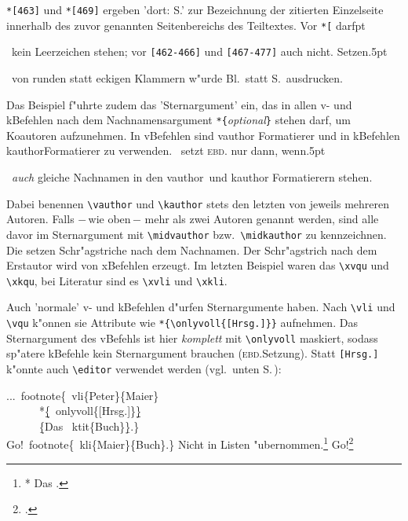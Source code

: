 \documentclass[12pt,a4paper]{article}
\newcommand{\pdfko}[1]{\kern #1pt
                          \strut\ignorespaces}%
\newcommand{\pbs}{\string\ \unskip}
\newcommand{\bs}{\protect\pbs}
\begin{document}
\vspace{.75ex}\noindent
\verb|*[463]| und \verb|*[469]| ergeben 'dort: S.' zur Bezeichnung der 
zitierten Einzelseite innerhalb des zuvor genannten Seitenbereichs des 
Teiltextes. Vor \verb|*[| darf\pdfko{1}\ kein Leerzeichen stehen; vor 
\verb|[462-466]| und \verb|[467-477]| auch nicht. Setzen\pdfko{.5}\ 
von runden statt eckigen Klammern w"urde Bl.\ statt S.\ ausdrucken.

Das Beispiel f"uhrte zudem das 'Sternargument' ein, das in allen v- 
und k\hy Befehlen nach dem Nachnamensargument \verb|*{|\textit{optional}\verb|}| 
stehen darf, um Koautoren aufzunehmen. In v\fhy Befehlen sind vauthor\hy 
Formatierer und in k\fhy Befehlen kauthor\fhy Formatierer zu verwenden. 
\BibArts\ setzt \textsc{ebd.} nur dann, wenn\pdfko{.5}\  
\textit{auch} gleiche Nachnamen in den vauthor\hy\ und kauthor\hy 
Formatierern stehen. 

Dabei benennen \verb|\vauthor| und \verb|\kauthor| stets den letzten von 
jeweils mehreren Autoren. Falls $-$\,wie oben\,$-$ mehr als zwei
Autoren genannt werden, sind alle davor im Sternargument mit 
\verb|\midvauthor| bzw.\ \verb|\midkauthor| zu kennzeichnen. Die setzen 
Schr"agstriche nach dem Nachnamen. Der Schr"agstrich nach dem Erstautor 
wird von x\fhy Befehlen erzeugt. Im letzten Beispiel waren das \verb|\xvqu| 
und \verb|\xkqu|, bei Literatur sind es \verb|\xvli| und 
\verb|\xkli|. 

Auch 'normale' v- und k\fhy Befehlen d"urfen Sternargumente haben.
Nach \verb|\vli| und \verb|\vqu| k"onnen sie Attribute wie 
\verb|*{\onlyvoll{[Hrsg.]}}| aufnehmen. Das Sternargument 
des v\fhy Befehls ist hier \textit{komplett} mit \verb|\onlyvoll| maskiert, sodass sp"atere 
k\fhy Befehle kein Sternargument brauchen (\textsc{ebd.}\hy Setzung).
Statt \verb|[Hrsg.]| k"onnte auch \verb|\editor| verwendet werden
(vgl.\ unten S.\,\pageref{editor}):

\vspace{-.25ex}
\Doppelbox
{
\vspace{-.3ex}
...\bs footnote\{\bs vli\{Peter\}\{Maier\} 
\\[.4ex] \ \ \ \ \ \ *\b{\b{\{}}\bs onlyvoll\{[Hrsg.]\}\b{\b{\}}} 
\\[.3ex] \ \ \ \ \ \ \b{\{}Das \bs ktit\{Buch\}\b{\}}.\} 
\\[.7ex] Go!\bs footnote\{\bs kli\{Maier\}\{Buch\}.\} 
}
{Nicht in Listen "ubernommen.\footnote{\notktitaddtok
{} *{\onlyvoll{[Hrsg.]}} {Das }.}
Go!\footnote{\printonlykli{Maier}{Buch}.}
}
\end{document}
